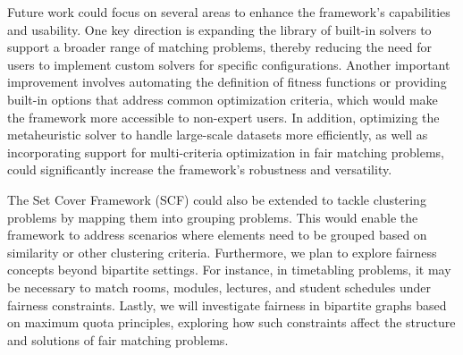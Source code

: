     Future work could focus on several areas to enhance the framework's capabilities and usability. One key direction is expanding the library of built-in solvers to support a broader range of matching problems, thereby reducing the need for users to implement custom solvers for specific configurations. 
    Another important improvement involves automating the definition of fitness functions or providing built-in options that address common optimization criteria, which would make the framework more accessible to non-expert users. 
    In addition, optimizing the metaheuristic solver to handle large-scale datasets more efficiently, as well as incorporating support for multi-criteria optimization in fair matching problems, could significantly increase the framework's robustness and versatility.

    The Set Cover Framework (SCF) could also be extended to tackle clustering problems by mapping them into grouping problems. This would enable the framework to address scenarios where elements need to be grouped based on similarity or other clustering criteria.
    Furthermore, we plan to explore fairness concepts beyond bipartite settings. For instance, in timetabling problems, it may be necessary to match rooms, modules, lectures, and student schedules under fairness constraints. 
    Lastly, we will investigate fairness in bipartite graphs based on maximum quota principles, exploring how such constraints affect the structure and solutions of fair matching problems.

